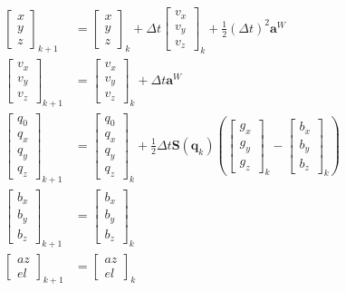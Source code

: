 \begin{align}
	\begin{bmatrix}
		x \\ y \\ z 
	\end{bmatrix}_{k+1}
	&= 
	\begin{bmatrix}
		x \\ y \\ z 
	\end{bmatrix}_{k}
	+ \Delta t
	\begin{bmatrix}
	v_x \\ v_y \\ v_z 
	\end{bmatrix}_{k}
	+ \frac{1}{2} (\Delta t)^2 \bm{a}^W
	\label{state_begin}
	\\
	\begin{bmatrix}
		v_x \\ v_y \\ v_z 
	\end{bmatrix}_{k+1}
	&= 
	\begin{bmatrix}
		v_x \\ v_y \\ v_z 
	\end{bmatrix}_{k}
	+ \Delta t \bm{a}^W
	\\
	\begin{bmatrix}
		q_0 \\ q_x \\ q_y \\ q_z 
	\end{bmatrix}_{k+1}
	&= 
	\begin{bmatrix}
		q_0 \\ q_x \\ q_y \\ q_z  
	\end{bmatrix}_{k}
	+ \frac{1}{2} \Delta t \bm{S} \left( \bm{q}_k \right) 
	\left(
	\begin{bmatrix}
		g_x \\ g_y \\ g_z
	\end{bmatrix}_{k}
	-
	\begin{bmatrix}
		b_x \\ b_y \\ b_z
	\end{bmatrix}_{k}
	\right)
	\\
	\begin{bmatrix}
		b_x \\ b_y \\ b_z
	\end{bmatrix}_{k+1}
	&= 
	\begin{bmatrix}
		b_x \\ b_y \\ b_z 
	\end{bmatrix}_{k}	
	\\
	\begin{bmatrix}
		az \\ el 
	\end{bmatrix}_{k+1}
	&= 
	\begin{bmatrix}
		az \\ el 
	\end{bmatrix}_{k}	
\end{align}

